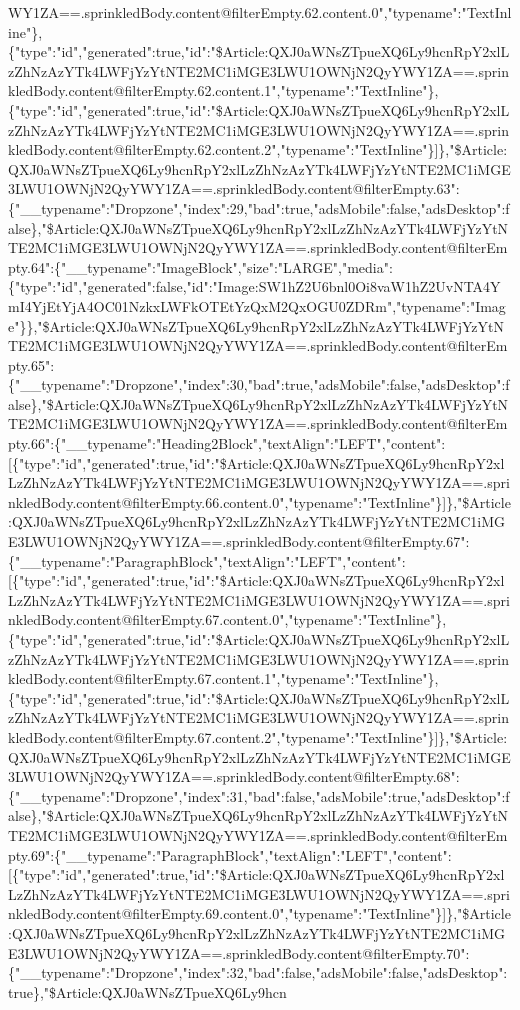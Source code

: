 WY1ZA==.sprinkledBody.content@filterEmpty.62.content.0","typename":"TextInline"\},\{"type":"id","generated":true,"id":"\$Article:QXJ0aWNsZTpueXQ6Ly9hcnRpY2xlLzZhNzAzYTk4LWFjYzYtNTE2MC1iMGE3LWU1OWNjN2QyYWY1ZA==.sprinkledBody.content@filterEmpty.62.content.1","typename":"TextInline"\},\{"type":"id","generated":true,"id":"\$Article:QXJ0aWNsZTpueXQ6Ly9hcnRpY2xlLzZhNzAzYTk4LWFjYzYtNTE2MC1iMGE3LWU1OWNjN2QyYWY1ZA==.sprinkledBody.content@filterEmpty.62.content.2","typename":"TextInline"\}{]}\},"\$Article:QXJ0aWNsZTpueXQ6Ly9hcnRpY2xlLzZhNzAzYTk4LWFjYzYtNTE2MC1iMGE3LWU1OWNjN2QyYWY1ZA==.sprinkledBody.content@filterEmpty.63":\{"\_\_typename":"Dropzone","index":29,"bad":true,"adsMobile":false,"adsDesktop":false\},"\$Article:QXJ0aWNsZTpueXQ6Ly9hcnRpY2xlLzZhNzAzYTk4LWFjYzYtNTE2MC1iMGE3LWU1OWNjN2QyYWY1ZA==.sprinkledBody.content@filterEmpty.64":\{"\_\_typename":"ImageBlock","size":"LARGE","media":\{"type":"id","generated":false,"id":"Image:SW1hZ2U6bnl0Oi8vaW1hZ2UvNTA4YmI4YjEtYjA4OC01NzkxLWFkOTEtYzQxM2QxOGU0ZDRm","typename":"Image"\}\},"\$Article:QXJ0aWNsZTpueXQ6Ly9hcnRpY2xlLzZhNzAzYTk4LWFjYzYtNTE2MC1iMGE3LWU1OWNjN2QyYWY1ZA==.sprinkledBody.content@filterEmpty.65":\{"\_\_typename":"Dropzone","index":30,"bad":true,"adsMobile":false,"adsDesktop":false\},"\$Article:QXJ0aWNsZTpueXQ6Ly9hcnRpY2xlLzZhNzAzYTk4LWFjYzYtNTE2MC1iMGE3LWU1OWNjN2QyYWY1ZA==.sprinkledBody.content@filterEmpty.66":\{"\_\_typename":"Heading2Block","textAlign":"LEFT","content":{[}\{"type":"id","generated":true,"id":"\$Article:QXJ0aWNsZTpueXQ6Ly9hcnRpY2xlLzZhNzAzYTk4LWFjYzYtNTE2MC1iMGE3LWU1OWNjN2QyYWY1ZA==.sprinkledBody.content@filterEmpty.66.content.0","typename":"TextInline"\}{]}\},"\$Article:QXJ0aWNsZTpueXQ6Ly9hcnRpY2xlLzZhNzAzYTk4LWFjYzYtNTE2MC1iMGE3LWU1OWNjN2QyYWY1ZA==.sprinkledBody.content@filterEmpty.67":\{"\_\_typename":"ParagraphBlock","textAlign":"LEFT","content":{[}\{"type":"id","generated":true,"id":"\$Article:QXJ0aWNsZTpueXQ6Ly9hcnRpY2xlLzZhNzAzYTk4LWFjYzYtNTE2MC1iMGE3LWU1OWNjN2QyYWY1ZA==.sprinkledBody.content@filterEmpty.67.content.0","typename":"TextInline"\},\{"type":"id","generated":true,"id":"\$Article:QXJ0aWNsZTpueXQ6Ly9hcnRpY2xlLzZhNzAzYTk4LWFjYzYtNTE2MC1iMGE3LWU1OWNjN2QyYWY1ZA==.sprinkledBody.content@filterEmpty.67.content.1","typename":"TextInline"\},\{"type":"id","generated":true,"id":"\$Article:QXJ0aWNsZTpueXQ6Ly9hcnRpY2xlLzZhNzAzYTk4LWFjYzYtNTE2MC1iMGE3LWU1OWNjN2QyYWY1ZA==.sprinkledBody.content@filterEmpty.67.content.2","typename":"TextInline"\}{]}\},"\$Article:QXJ0aWNsZTpueXQ6Ly9hcnRpY2xlLzZhNzAzYTk4LWFjYzYtNTE2MC1iMGE3LWU1OWNjN2QyYWY1ZA==.sprinkledBody.content@filterEmpty.68":\{"\_\_typename":"Dropzone","index":31,"bad":false,"adsMobile":true,"adsDesktop":false\},"\$Article:QXJ0aWNsZTpueXQ6Ly9hcnRpY2xlLzZhNzAzYTk4LWFjYzYtNTE2MC1iMGE3LWU1OWNjN2QyYWY1ZA==.sprinkledBody.content@filterEmpty.69":\{"\_\_typename":"ParagraphBlock","textAlign":"LEFT","content":{[}\{"type":"id","generated":true,"id":"\$Article:QXJ0aWNsZTpueXQ6Ly9hcnRpY2xlLzZhNzAzYTk4LWFjYzYtNTE2MC1iMGE3LWU1OWNjN2QyYWY1ZA==.sprinkledBody.content@filterEmpty.69.content.0","typename":"TextInline"\}{]}\},"\$Article:QXJ0aWNsZTpueXQ6Ly9hcnRpY2xlLzZhNzAzYTk4LWFjYzYtNTE2MC1iMGE3LWU1OWNjN2QyYWY1ZA==.sprinkledBody.content@filterEmpty.70":\{"\_\_typename":"Dropzone","index":32,"bad":false,"adsMobile":false,"adsDesktop":true\},"\$Article:QXJ0aWNsZTpueXQ6Ly9hcn